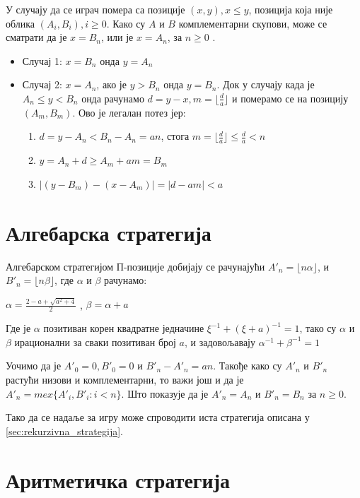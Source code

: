 \documentclass[a4paper]{article}
\begin{document}
У случају да се играч помера са позиције $ (x, y), x \le y $, позиција која није облика $ (A_{i}, B_{i}), i \ge 0 $. Како су $ A $ и $ B $ комплементарни скупови, може се сматрати да је $ x = B_{n} $, или је $ x = A_{n} $, за $ n \ge 0 $ .
\begin{itemize}
	\item Случај 1: $ x = B_{n} $ онда $ y = A_{n} $
	\item Случај 2: $ x = A_{n} $, ако је $ y > B_{n} $ онда $ y = B_{n} $. Док у случају када је $ A_{n} \le y < B_{n} $ онда рачунамо $ d = y - x, m = \lfloor \frac{d}{a} \rfloor $ и померамо се на позицију $ (A_{m}, B_{m}) $. Ово је легалан потез јер:
		\begin{enumerate}
			\item $ d = y - A_{n} < B_{n} - A_{n} = an $, стога $ m = \lfloor \frac{d}{a} \rfloor \le \frac{d}{a} < n $
			\item $ y = A_{n} + d \ge A_{m} + am = B_m $
			\item $ |(y - B_{m}) - (x - A_{m})| = |d - am| < a $
		\end{enumerate}
\end{itemize}

\section{Алгебарска стратегија}
\label{sec:algebarska_strategija}

Алгебарском стратегијом П-позиције добијају се рачунајући $ A'_{n} = \lfloor n\alpha \rfloor $, и $ B'_{n} = \lfloor n\beta \rfloor $, где $ \alpha $ и $ \beta $ рачунамо:  
\begin{center}
	$ \alpha = \frac{2 - a + \sqrt{a^2 + 4}}{2} $ , $ \beta = \alpha + a $ 
\end{center}
Где је $ \alpha $ позитиван корен квадратне једначине $ \xi^{-1} + (\xi+a)^{-1} = 1 $, тако су $ \alpha $ и $ \beta $ ирационални за сваки позитиван број $ a $, и задовољавају $ \alpha^{-1} + \beta^{-1} = 1 $

Уочимо да је $ A'_{0} = 0, B'_{0} = 0 $ и $ B'_{n} - A'_{n} = an $. Такође како су $ A'_{n} $ и $ B'_{n} $ растући низови и комплементарни, то важи још и да је $ A'_{n} = mex \{ A'_{i}, B'_{i} : i < n \} $. Што показује да је $ A'_{n} = A_{n} $ и $ B'_{n} = B_{n}  $ за $ n \ge 0 $.

Тако да се надаље за игру може спроводити иста стратегија описана у \ref{sec:rekurzivna_strategija}. 

\section{Аритметичка стратегија}
\label{sec:aritmeticka_strategija}
\end{document}
